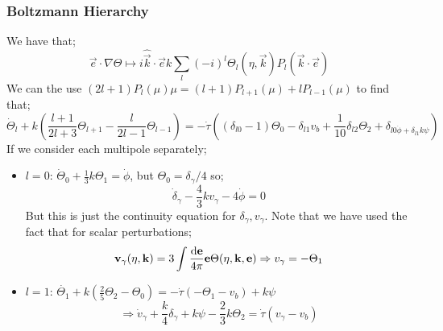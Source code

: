 \subsubsection{Boltzmann Hierarchy}
We have that;
\begin{equation*}
\vec{e}\cdot\nabla \Theta \mapsto i\hat{\vec{k}}\cdot\vec{e}k\sum_{l}{(-i)^{l}\Theta_l(\eta, \vec{k})P_l(\vec{k}\cdot\vec{e})}
\end{equation*}
We can the use $(2l + 1)P_l(\mu) \mu = (l + 1)P_{l + 1}(\mu) + lP_{l - 1}(\mu)$ to find that;
\begin{dmath}
\dot{\Theta}_l + k\left(\frac{l + 1}{2l + 3}\Theta_{l + 1} - \frac{l}{2l - 1}\Theta_{l - 1}\right) = -\dot{\tau}\left((\delta_{l0} - 1)\Theta_0 - \delta_{l1}v_b + \frac{1}{10}\delta_{l2}\Theta_2 + \delta_{l0 \dot{\phi} + \delta_{l1}k\psi}\right)
\end{dmath}
If we consider each multipole separately;
\begin{itemize}
\item $l = 0$: $\dot{\Theta}_0 + \frac{1}{3}k\Theta_1 = \dot{\phi}$, but $\Theta_0 = \delta_\gamma / 4$ so;
\begin{equation*}
\dot{\delta}_\gamma - \frac{4}{3}kv_\gamma - 4\dot{\phi} = 0
\end{equation*}
But this is just the continuity equation for $\delta_\gamma, v_\gamma$. Note that we have used the fact that for scalar perturbations;
\begin{equation*}
\mathbf{v}_\gamma(\eta, \mathbf{k}) = 3\int{\frac{\text{d}\mathbf{e}}{4\pi}\mathbf{e}\Theta(\eta, \mathbf{k}, \mathbf{e})} \Rightarrow v_\gamma = -\Theta_1
\end{equation*}
\item $l = 1$: $\dot{\Theta_1} + k\left(\frac{2}{5}\Theta_2 - \Theta_0\right) = -\dot{\tau}(- \Theta_1 - v_b) + k\psi$
\begin{equation*}
\Rightarrow \dot{v}_\gamma + \frac{k}{4}\delta_\gamma + k\psi - \frac{2}{3}k\Theta_2 = \dot{\tau}(v_\gamma - v_b)
\end{equation*}
\end{itemize}
